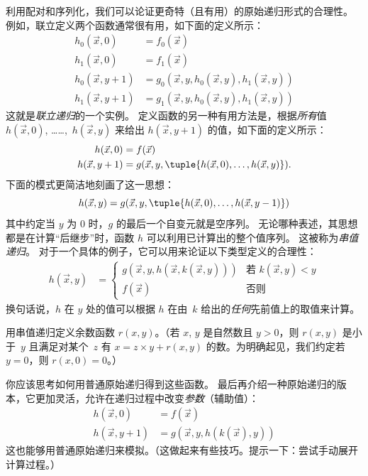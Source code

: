 \documentclass[../../../include/open-logic-section]{subfiles}
\begin{document}


利用配对和序列化，我们可以论证更奇特（且有用）的原始递归形式的合理性。
例如，联立定义两个函数通常很有用，如下面的定义所示：
\begin{align*}
h_0(\vec x, 0) & = f_0(\vec x) \\
h_1(\vec x, 0) & = f_1(\vec x) \\
h_0(\vec x, y+1) & = g_0(\vec x, y, h_0(\vec x, y), h_1(\vec x, y)) \\
h_1(\vec x, y+1) & = g_1(\vec x, y, h_0(\vec x, y), h_1(\vec x, y))
\end{align*}
这就是\emph{联立递归}的一个实例。
定义函数的另一种有用方法是，根据\emph{所有}值 $h(\vec x, 0)$, ……,~$h(\vec x, y)$ 来给出 $h(\vec x, y+1)$ 的值，如下面的定义所示：
\begin{align*}
h(\vec x, 0) & = f(\vec x) \\
h(\vec x, y+1) & = g(\vec x, y, \tuple{h(\vec x, 0), \dots, h(\vec x, y)}).
\end{align*}
下面的模式更简洁地刻画了这一思想：
\[
h(\vec x, y) = g(\vec x, y, \tuple{h(\vec x, 0), \dots, h(\vec x, y-1)})
\]
其中约定当 $y$ 为 $0$ 时，$g$ 的最后一个自变元就是空序列。
无论哪种表述，其思想都是在计算“后继步”时，函数 $h$ 可以利用已计算出的整个值序列。
这被称为\emph{串值递归}。
对于一个具体的例子，它可以用来论证以下类型定义的合理性：
\begin{align*}
h(\vec x, y) & = \begin{cases}
  g(\vec x, y, h(\vec x, k(\vec x, y))) & \text{若 $k(\vec x, y) < y$} \\
  f(\vec x) & \text{否则}
\end{cases}
\end{align*}
换句话说，$h$ 在 $y$ 处的值可以根据 $h$ 在由~$k$ 给出的\emph{任何}先前值上的取值来计算。

\begin{prob}
  用串值递归定义余数函数 $r(x,y)$。（若 $x$, $y$ 是自然数且 $y > 0$，则 $r(x,y)$ 是小于~$y$ 且满足对某个~$z$ 有 $x = z\times y + r(x,y)$ 的数。为明确起见，我们约定若 $y=0$，则 $r(x,0) = 0$。）
\end{prob}

你应该思考如何用普通原始递归得到这些函数。
最后再介绍一种原始递归的版本，它更加灵活，允许在递归过程中改变\emph{参数}（辅助值）：
\begin{align*}
h(\vec x, 0) & = f(\vec x) \\
h(\vec x, y+1) & = g(\vec x, y, h(k(\vec x), y))
\end{align*}
这也能够用普通原始递归来模拟。（这做起来有些技巧。提示一下：尝试手动展开计算过程。）
\end{document}
